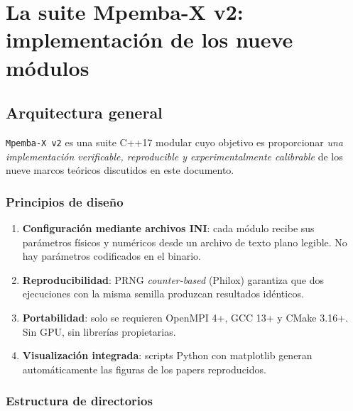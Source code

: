 \chapter{La suite Mpemba-X v2: implementación de los nueve módulos}
\label{ch:implementacion}

\section{Arquitectura general}

\texttt{Mpemba-X v2} es una suite C++17 modular cuyo objetivo es proporcionar 
\emph{una implementación verificable, reproducible y experimentalmente 
calibrable} de los nueve marcos teóricos discutidos en este documento.

\subsection{Principios de diseño}

\begin{enumerate}
\item \textbf{Configuración mediante archivos INI}: cada módulo recibe sus 
parámetros físicos y numéricos desde un archivo de texto plano legible. 
No hay parámetros codificados en el binario.
\item \textbf{Reproducibilidad}: PRNG \emph{counter-based} (Philox) garantiza 
que dos ejecuciones con la misma semilla produzcan resultados idénticos.
\item \textbf{Portabilidad}: solo se requieren OpenMPI 4+, GCC 13+ y CMake 
3.16+. Sin GPU, sin librerías propietarias.
\item \textbf{Visualización integrada}: scripts Python con matplotlib 
generan automáticamente las figuras de los papers reproducidos.
\end{enumerate}

\subsection{Estructura de directorios}

